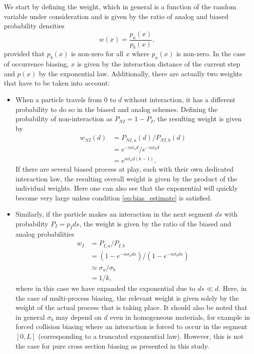 We start by defining the weight, which in general is a function of the random variable under consideration and is given by the ratio of analog and biased probability densities
%
\begin{equation} \label{eq:weight}
w(x) = \frac{p_a(x)}{p_b(x)},
\end{equation}
%
provided that $p_b(x)$ is non-zero for all $x$ where $p_a(x)$ is non-zero. In the case of occurrence biasing, $x$ is given by the interaction distance of the current step and $p(x)$ by the exponential law. Additionally, there are actually two weights that have to be taken into account:
%
\begin{itemize}
    \item When a particle travels from 0 to $d$ without interaction, it has a different probability to do so in the biased and analog schemes. Defining the probability of non-interaction as $P_{NI} = 1 - P_{I}$, the resulting weight is given by
    \begin{equation} \label{eq:weight_NI}
    \begin{split}
    w_{NI}(d) &= P_{NI,a}(d)/P_{NI,b}(d)\\
    &=e^{-n\sigma_a d}/e^{-n\sigma_b d}\\
    &= e^{n\sigma_a d(k-1)}.
    \end{split}
    \end{equation}
    If there are several biased process at play, each with their own dedicated interaction law, the resulting overall weight is given by the product of the individual weights. Here one can also see that the exponential will quickly become very large unless condition \ref{eq:bias_estimate} is satisfied.
    \item Similarly, if the particle makes an interaction in the next segment $ds$ with probability $P_I = p_I ds$, the weight is given by the ratio of the biased and analog probabilities
    \begin{equation} \label{eq:weight_I}
    \begin{split}
    w_{I} &= P_{I,a}/P_{I,b}\\
    &=(1-e^{-n\sigma_a ds})/(1-e^{-n\sigma_b ds})\\
    &\simeq \sigma_a / \sigma_b\\
    &= 1/k,
    \end{split}
    \end{equation}
    where in this case we have expanded the exponential due to $ds \ll d$. Here, in the case of multi-process biasing, the relevant weight is given solely by the weight of the actual process that is taking place. It should also be noted that in general $\sigma_b$ may depend on $d$ even in homogeneous materials, for example in forced collision biasing where an interaction is forced to occur in the segment $[0,L]$ (corresponding to a truncated exponential law). However, this is not the case for pure cross section biasing as presented in this study.
\end{itemize}
